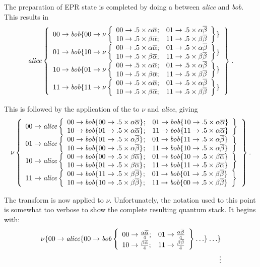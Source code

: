 The preparation of EPR state is completed by  doing a \Cnot{}
between \emph{alice} and \emph{bob}. This results in
\[
\qsqbitAllUp{\text{\emph{alice}}}
	 {\qsnodeij{\text{\emph{bob}}}{00}{\nustack{.5\times}}{}}
	 {\qsnodeij{\text{\emph{bob}}}{10}{\nustack{.5\times}}{}}
	 {\qsnodeij{\text{\emph{bob}}}{01}{\nustack{.5\times}}{}}
	 {\qsnodeij{\text{\emph{bob}}}{11}{\nustack{.5\times}}{}}
         {}.
\]

This is followed by the application of
 the \Cnot{} to $\nu$ and \emph{alice}, giving 
\[
\qsqbitAllUp{\nu}
    {\qsqbitUp{\text{\emph{alice}}}
	 {\qsnodeij{\text{\emph{bob}}}{00}{.5\times\alpha\overline{\alpha}}{}}
	 {\qsnodeij{\text{\emph{bob}}}{10}{.5\times\alpha\overline{\alpha}}{}}
	 {\qsnodeij{\text{\emph{bob}}}{01}{.5\times\alpha\overline{\alpha}}{}}
	 {\qsnodeij{\text{\emph{bob}}}{11}{.5\times\alpha\overline{\alpha}}{}}
	{}}
{\qsqbitUp{\text{\emph{alice}}}
	 {\qsnodeij{\text{\emph{bob}}}{01}{.5\times\alpha\overline{\beta}}{}}
	 {\qsnodeij{\text{\emph{bob}}}{11}{.5\times\alpha\overline{\beta}}{}}
	 {\qsnodeij{\text{\emph{bob}}}{00}{.5\times\alpha\overline{\beta}}{}}
	 {\qsnodeij{\text{\emph{bob}}}{10}{.5\times\alpha\overline{\beta}}{}}
	{}}
{\qsqbitUp{\text{\emph{alice}}}
	 {\qsnodeij{\text{\emph{bob}}}{00}{.5\times\beta\overline{\alpha}}{}}
	 {\qsnodeij{\text{\emph{bob}}}{10}{.5\times\beta\overline{\alpha}}{}}
	 {\qsnodeij{\text{\emph{bob}}}{01}{.5\times\beta\overline{\alpha}}{}}
	 {\qsnodeij{\text{\emph{bob}}}{11}{.5\times\beta\overline{\alpha}}{}}
	{}}
{\qsqbitUp{\text{\emph{alice}}}
	 {\qsnodeij{\text{\emph{bob}}}{11}{.5\times\beta\overline{\beta}}{}}
	 {\qsnodeij{\text{\emph{bob}}}{01}{.5\times\beta\overline{\beta}}{}}
	 {\qsnodeij{\text{\emph{bob}}}{10}{.5\times\beta\overline{\beta}}{}}
	 {\qsnodeij{\text{\emph{bob}}}{00}{.5\times\beta\overline{\beta}}{}}
	{}}{}.
\]

The \Had{} transform is now applied to $\nu$. Unfortunately, the notation
used to this point is somewhat too verbose to show the complete 
resulting quantum stack. It begins with:
\begin{align*}
\qsnodeij{\nu}{00} {\qsnodeij{\text{\emph{alice}}}{00}
                   {\qsqbitUp{\text{\emph{bob}}}
                             {\frac{\alpha\overline{\alpha}}{4}} 
		             {\frac{\alpha\overline{\beta}}{4}} 
                             {\frac{\beta\overline{\alpha}}{4}} 
                             {\frac{\beta\overline{\beta}}{4}}{}\ldots}{}\ldots}{}\\
\vdots
\end{align*}


